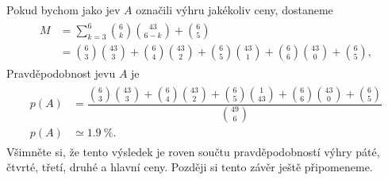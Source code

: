 \begin{mdframed}[style=mdexam]
\begin{example}
\begin{itemize}[leftmargin=10pt,noitemsep]
            Pokud bychom jako jev \(A\) označili výhru jakékoliv ceny, dostaneme
            \begin{gather*}
              \begin{align*}
              M  &= \sum_{k=3}^{6}\binom{6}{k}\binom{43}{6-k} + \binom{6}{5}                      \\
                 &= \binom{6}{3}\binom{43}{3} + \binom{6}{4}\binom{43}{2} + 
                    \binom{6}{5}\binom{43}{1} + \binom{6}{6}\binom{43}{0} + \binom{6}{5},   
              \end{align*}    
            \end{gather*}  
            Pravděpodobnost jevu \(A\) je    
            \begin{gather*}
              \begin{align*}
                p(A) &= \dfrac{\binom{6}{3}\binom{43}{3}+\binom{6}{4}\binom{43}{2}+
                               \binom{6}{5}\binom{1}{43}+\binom{6}{6}\binom{43}{0}+\binom{6}{5}}
                              {\binom{49}{6}}                                                    \\
                p(A) &\simeq\SI{1.9}{\percent}.
              \end{align*}    
            \end{gather*}
            Všimněte si, že tento výsledek je roven součtu pravděpodobností výhry páté, čtvrté,
            třetí, druhé a hlavní ceny. Později si tento závěr ještě připomeneme.
    \end{itemize}  
  \end{example}
\end{mdframed}